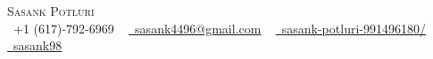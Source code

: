 \documentclass[letterpaper,10pt]{article}
\begin{document}

\begin{center}
    {\Huge \scshape Sasank Potluri} \\ \vspace{1pt}
    \small \raisebox{-0.1\height}\faPhone\ +1 (617)-792-6969 ~ 
    \href{mailto:sasank4496@gmail.com}{\raisebox{-0.2\height}\faEnvelope\ \underline{sasank4496@gmail.com}} ~ 
    \href{https://www.linkedin.com/in/sasank-potluri-991496180/}{\raisebox{-0.2\height}\faLinkedin\ \underline{sasank-potluri-991496180/}}  ~
    \href{https://github.com/sasank98}{\raisebox{-0.2\height}\faGithub\ \underline{sasank98}}
    \vspace{-8pt}
\end{center}


\end{document}
